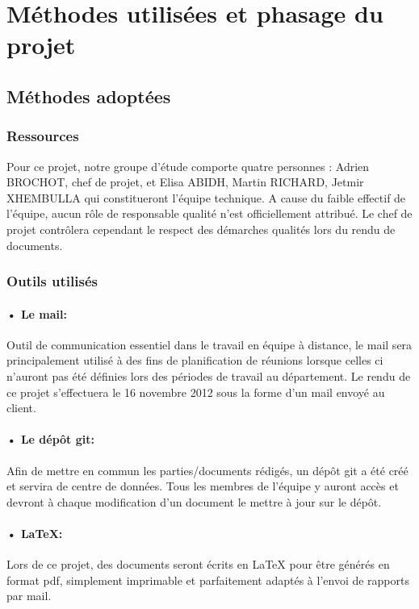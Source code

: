 \section{Méthodes utilisées et phasage du projet}

\subsection{Méthodes adoptées}
\subsubsection{Ressources}
Pour ce projet, notre groupe d'étude comporte quatre personnes : Adrien BROCHOT, chef de projet, et Elisa ABIDH, Martin RICHARD, Jetmir XHEMBULLA qui constitueront l'équipe technique. A cause du faible effectif de l'équipe, aucun rôle de responsable qualité n'est officiellement attribué. Le chef de projet contrôlera cependant le respect des démarches qualités lors du rendu de documents.

\subsubsection{Outils utilisés}
\paragraph*{• Le mail:}Outil de communication essentiel dans le travail en équipe à distance, le mail sera principalement utilisé à des fins de planification de réunions lorsque celles ci n'auront pas été définies lors des périodes de travail au département. Le rendu de ce projet s'effectuera le 16 novembre 2012 sous la forme d'un mail envoyé au client.

\paragraph*{• Le dépôt git:}Afin de mettre en commun les parties/documents rédigés, un dépôt git a été créé et servira de centre de données. Tous les membres de l'équipe y auront accès et devront à chaque modification d'un document le mettre à jour sur le dépôt.

\paragraph*{• LaTeX:} Lors de ce projet, des documents seront écrits en LaTeX pour être générés en format pdf, simplement imprimable et parfaitement adaptés à l'envoi de rapports par mail.

